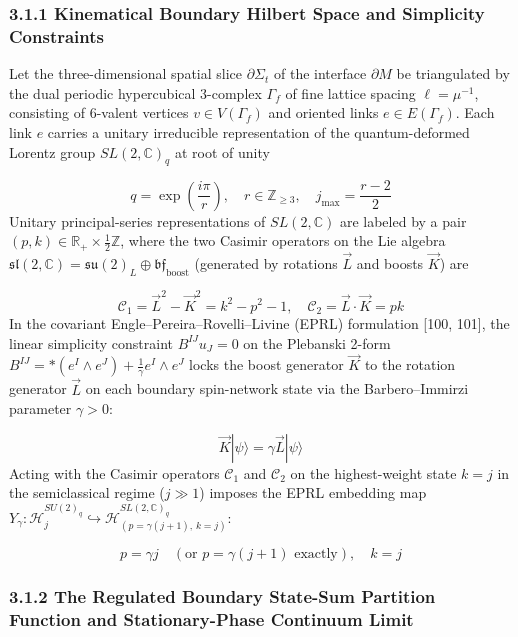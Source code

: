 \documentclass[aps,prd,onecolumn,superscriptaddress,nofootinbib,longbibliography,10pt]{revtex4-2}
\begin{document}
  
\subsubsection*{3.1.1 Kinematical Boundary Hilbert Space and Simplicity Constraints}

  Let the three-dimensional spatial slice \(\partial\Sigma_t\) of the interface \(\partial M\) be triangulated by the dual periodic hypercubical 3-complex \(\Gamma_f\) of fine lattice spacing \(\ell = \mu^{-1}\), consisting of 6-valent vertices \(v \in V(\Gamma_f)\) and oriented links \(e \in E(\Gamma_f)\). Each link \(e\) carries a unitary irreducible representation of the quantum-deformed Lorentz group \(SL(2,\mathbb{C})_q\) at root of unity


  \[ q = \exp\left(\frac{i\pi}{r}\right), \quad r \in \mathbb{Z}_{\ge 3}, \quad j_{\max} = \frac{r - 2}{2} \]
  Unitary principal-series representations of \(SL(2,\mathbb{C})\) are labeled by a pair \((p,k) \in \mathbb{R}_+ \times \frac{1}{2}\mathbb{Z}\), where the two Casimir operators on the Lie algebra \(\mathfrak{sl}(2,\mathbb{C}) = \mathfrak{su}(2)_L \oplus \mathfrak{bf}_{\text{boost}}\) (generated by rotations \(\vec{L}\) and boosts \(\vec{K}\)) are


  \[ \mathcal{C}_1 = \vec{L}^2 - \vec{K}^2 = k^2 - p^2 - 1, \quad \mathcal{C}_2 = \vec{L}\cdot\vec{K} = pk \]
  In the covariant Engle–Pereira–Rovelli–Livine (EPRL) formulation [100, 101], the linear simplicity constraint \(B^{IJ}u_J = 0\) on the Plebanski 2-form \(B^{IJ} = *(e^I \wedge e^J) + \frac{1}{\gamma}e^I \wedge e^J\) locks the boost generator \(\vec{K}\) to the rotation generator \(\vec{L}\) on each boundary spin-network state via the Barbero–Immirzi parameter \(\gamma > 0\):


  \[ \vec{K}|\psi\rangle = \gamma\vec{L}|\psi\rangle \]
  Acting with the Casimir operators \(\mathcal{C}_1\) and \(\mathcal{C}_2\) on the highest-weight state \(k = j\) in the semiclassical regime (\(j \gg 1\)) imposes the EPRL embedding map \(Y_\gamma : \mathcal{H}_j^{SU(2)_q} \hookrightarrow \mathcal{H}_{(p=\gamma(j+1),\,k=j)}^{SL(2,\mathbb{C})_q}\):


  \[ p = \gamma j \quad (\text{or } p = \gamma(j+1)\text{ exactly}), \quad k = j \]

  
\subsubsection*{3.1.2 The Regulated Boundary State-Sum Partition Function and Stationary-Phase Continuum Limit}
\end{document}
